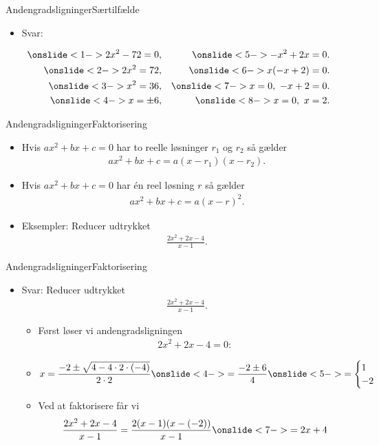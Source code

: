 \setbeamercovered{}
\begin{frame}{Andengradsligninger}{Særtilfælde}
	\begin{itemize}
		\item Svar:
	\end{itemize}
\begin{align*}
\onslide<1->{2x^2-72=0,}&& \onslide<5->{-x^2+2x=0.}\\
\onslide<2->{2x^2=72,}&& \onslide<6->{x(-x+2)=0.}\\
\onslide<3->{x^2=36,}&& \onslide<7->{x=0,\ -x+2=0.}\\
\onslide<4->{x=\pm 6,}&& \onslide<8->{x=0,\ x=2.}\\
\end{align*}
\end{frame}
\begin{frame}{Andengradsligninger}{Faktorisering}
\begin{itemize}
		\setlength\itemsep{1em}
	\item<1-> Hvis $ax^2+bx+c=0$ har to reelle løsninger $r_1$ og $r_2$ så gælder
	\begin{align*}
	ax^2+bx+c=a(x-r_1)(x-r_2).
	\end{align*}
	\item<2-> Hvis $ax^2+bx+c=0$ har én reel løsning $r$ så gælder
	\begin{align*}
	ax^2+bx+c=a(x-r)^2.
	\end{align*}
	\item<3-> Eksempler: Reducer udtrykket
	\begin{align*}
	\frac{2x^2+2x-4}{x-1}.
	\end{align*}
\end{itemize}
\end{frame}

\begin{frame}{Andengradsligninger}{Faktorisering}
	\begin{itemize}
		\item Svar: Reducer udtrykket
			\begin{align*}
		\frac{2x^2+2x-4}{x-1}.
		\end{align*}
		\begin{itemize}
			\item<2-> Først løser vi andengradsligningen
			\begin{align*}
			2x^2+2x-4=0:
			\end{align*}
			\item<3-> 
			\begin{align*}
			x=\frac{-2\pm \sqrt{4-4\cdot 2\cdot (-4)}}{2\cdot 2}\onslide<4->{=\frac{-2\pm 6}{4}}\onslide<5->{=\begin{cases}
			1\\-2
			\end{cases}}
			\end{align*}
			\item<6-> Ved at faktorisere får vi
			\begin{align*}
		\frac{2x^2+2x-4}{x-1}=\frac{2(x-1)(x-(-2))}{x-1}\onslide<7->{=2x+4}
			\end{align*}
		\end{itemize}
	\end{itemize}
	
\end{frame}
